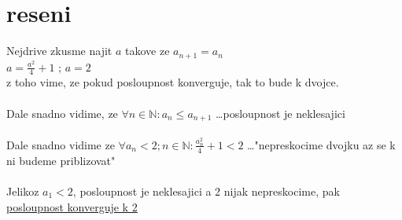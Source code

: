 \documentclass[a4paper]{article}
\def\doubleunderline#1{\underline{\underline{#1}}}
\begin{document}
\section*{reseni}
Nejdrive zkusme najit $a$ takove ze $a_{n+1} = a_n$\\
$a = \frac{a^2}{4} + 1$ ; $a = 2$\\
z toho vime, ze pokud posloupnost konverguje, tak to bude k dvojce.\\
\\
Dale snadno vidime, ze $\forall n \in \mathbb{N}: a_n \leq a_{n+1}$ \dots posloupnost je neklesajici\\
\\
Dale snadno vidime ze $\forall a_n < 2; n \in \mathbb{N}: \frac{a^2_n}{4} + 1 < 2$ \dots "nepreskocime dvojku az se k ni budeme priblizovat"\\
\\
Jelikoz $a_1 < 2$, posloupnost je neklesajici a 2 nijak 
nepreskocime, pak\\
\doubleunderline{posloupnost konverguje k 2}\\
\end{document}
